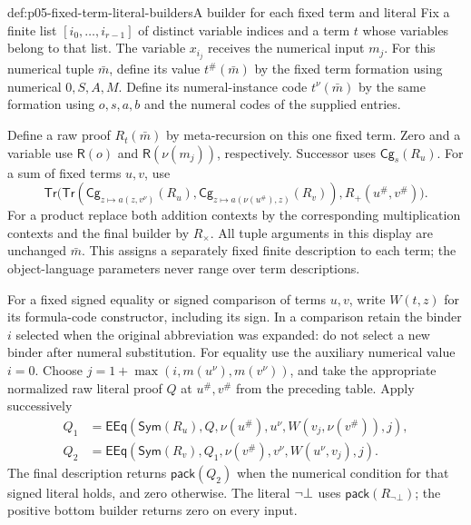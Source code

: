\begin{hbdefinition}{def:p05-fixed-term-literal-builders}{A builder for each fixed term and literal}
Fix a finite list \([i_0,\ldots,i_{r-1}]\) of distinct variable indices
and a term \(t\) whose variables belong to that list. The variable
\(x_{i_j}\) receives the numerical input \(m_j\). For this numerical tuple
\(\bar m\), define its value \(t^\#(\bar m)\) by the fixed term
formation using numerical \(0,S,A,M\). Define its numeral-instance code
\(t^\nu(\bar m)\) by the same formation using \(o,s,a,b\) and the
numeral codes of the supplied entries.

Define a raw proof \(R_t(\bar m)\) by meta-recursion on this one fixed
term. Zero and a variable use \(\mathsf R(o)\) and
\(\mathsf R(\nu(m_j))\), respectively. Successor uses
\(\mathsf{Cg}_s(R_u)\). For a sum of fixed terms \(u,v\), use
\[
 \mathsf{Tr}\bigl(
  \mathsf{Tr}(\mathsf{Cg}_{z\mapsto a(z,v^\nu)}(R_u),
       \mathsf{Cg}_{z\mapsto a(\nu(u^\#),z)}(R_v)),
                              R_+(u^\#,v^\#)\bigr).
\]
For a product replace both addition contexts by the corresponding
multiplication contexts and the final builder by \(R_\times\).
All tuple arguments in this display are unchanged \(\bar m\).
This assigns a separately fixed finite description to each term; the
object-language parameters never range over term descriptions.

For a fixed signed equality or signed comparison of terms \(u,v\), write
\(W(t,z)\) for its formula-code constructor, including its sign. In a
comparison retain the binder \(i\) selected when the original abbreviation
was expanded: do not select a new binder after numeral substitution.
For equality use the auxiliary numerical value \(i=0\). Choose
\(j=1+\max(i,m(u^\nu),m(v^\nu))\), and take the appropriate normalized
raw literal proof \(Q\) at \(u^\#,v^\#\) from the preceding table.
Apply successively
\[
\begin{aligned}
 Q_1&=\mathsf{EEq}(\mathsf{Sym}(R_u),Q,
                   \nu(u^\#),u^\nu,W(v_j,\nu(v^\#)),j),\\
 Q_2&=\mathsf{EEq}(\mathsf{Sym}(R_v),Q_1,
                   \nu(v^\#),v^\nu,W(u^\nu,v_j),j).
\end{aligned}
\]
The final description returns \(\mathsf{pack}(Q_2)\) when the numerical
condition for that signed literal holds, and zero otherwise. The literal
\(\neg\bot\) uses \(\mathsf{pack}(R_{\neg\bot})\); the positive
bottom builder returns zero on every input.
\end{hbdefinition}

